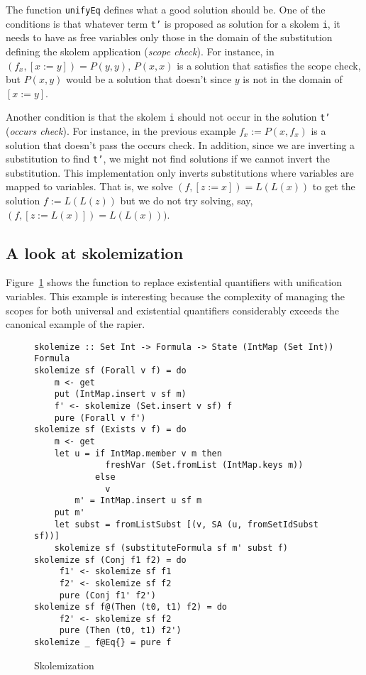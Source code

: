 \documentclass[sigconf, review]{acmart}
\newcommand{\tc}[1]{{\small\texttt{#1}}}
\begin{document}
The function \tc{unifyEq} defines what a good solution should be.
One of the conditions is that whatever term \tc{t'} is proposed
as solution for a skolem \tc{i}, it needs to have as free variables only those in the
domain of the substitution defining the skolem application
(\textit{scope check}). For instance, in $(f_x , [x:=y]) = P(y,y)$,
$P(x,x)$ is a solution that satisfies the scope check, but $P(x,y)$ would be a solution
that doesn't since $y$ is not in the domain of $[x:=y]$.

Another condition is that the skolem \tc{i} should not occur in the solution
\tc{t'} (\textit{occurs check}). For instance, in the previous example
$f_x:=P(x,f_x)$ is a solution that doesn't pass the occurs check. In addition,
since we are inverting a substitution to find
\tc{t'}, we might not find solutions if we cannot invert the
substitution. This implementation only inverts substitutions where
variables are mapped to variables. That is, we solve $(f, [z:=x]) = L(L(x))$
to get the solution $f:=L(L(z))$ but we do not try solving, say, $(f, [z:=L(x)]) = L(L(x)))$.


\subsection{A look at skolemization}
\label{sec:skolemize}

Figure~\ref{skolemization} shows the function to replace existential quantifiers
with unification variables. This example is interesting because the complexity of
managing the scopes for both universal and existential quantifiers
considerably exceeds the canonical example of the rapier.

\begin{figure}
\begin{verbatim}
skolemize :: Set Int -> Formula -> State (IntMap (Set Int)) Formula
skolemize sf (Forall v f) = do
    m <- get
    put (IntMap.insert v sf m)
    f' <- skolemize (Set.insert v sf) f
    pure (Forall v f')
skolemize sf (Exists v f) = do
    m <- get
    let u = if IntMap.member v m then
              freshVar (Set.fromList (IntMap.keys m))
            else
              v
        m' = IntMap.insert u sf m
    put m'
    let subst = fromListSubst [(v, SA (u, fromSetIdSubst sf))]
    skolemize sf (substituteFormula sf m' subst f)
skolemize sf (Conj f1 f2) = do
     f1' <- skolemize sf f1
     f2' <- skolemize sf f2
     pure (Conj f1' f2')
skolemize sf f@(Then (t0, t1) f2) = do
     f2' <- skolemize sf f2
     pure (Then (t0, t1) f2')
skolemize _ f@Eq{} = pure f
\end{verbatim}
\caption{Skolemization}
\label{skolemization}
\end{figure}
\end{document}
